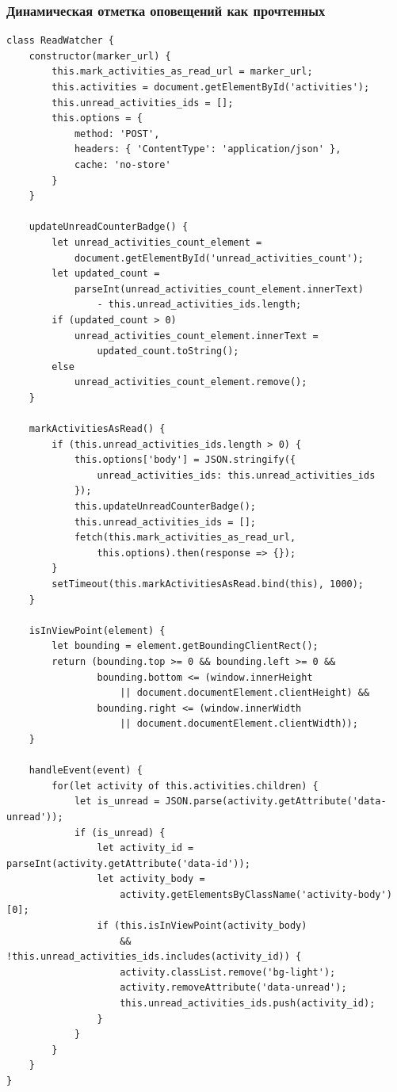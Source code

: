 \documentclass[12pt, a4paper, oneside]{article}
\begin{document}
\subsubsection{Динамическая отметка оповещений как прочтенных}
\begin{verbatim}
class ReadWatcher {
    constructor(marker_url) {
        this.mark_activities_as_read_url = marker_url;
        this.activities = document.getElementById('activities');
        this.unread_activities_ids = [];
        this.options = { 
            method: 'POST',
            headers: { 'ContentType': 'application/json' },
            cache: 'no-store' 
        }
    }

    updateUnreadCounterBadge() {
        let unread_activities_count_element = 
            document.getElementById('unread_activities_count');
        let updated_count = 
            parseInt(unread_activities_count_element.innerText) 
                - this.unread_activities_ids.length;
        if (updated_count > 0)
            unread_activities_count_element.innerText = 
                updated_count.toString();
        else
            unread_activities_count_element.remove();
    }

    markActivitiesAsRead() {
        if (this.unread_activities_ids.length > 0) {
            this.options['body'] = JSON.stringify({
                unread_activities_ids: this.unread_activities_ids 
            });
            this.updateUnreadCounterBadge();
            this.unread_activities_ids = [];
            fetch(this.mark_activities_as_read_url, 
                this.options).then(response => {});
        }
        setTimeout(this.markActivitiesAsRead.bind(this), 1000);
    }

    isInViewPoint(element) {
        let bounding = element.getBoundingClientRect();
        return (bounding.top >= 0 && bounding.left >= 0 &&
                bounding.bottom <= (window.innerHeight 
                    || document.documentElement.clientHeight) &&
                bounding.right <= (window.innerWidth 
                    || document.documentElement.clientWidth));
    }

    handleEvent(event) {
        for(let activity of this.activities.children) {
            let is_unread = JSON.parse(activity.getAttribute('data-unread'));
            if (is_unread) {
                let activity_id = parseInt(activity.getAttribute('data-id'));
                let activity_body = 
                    activity.getElementsByClassName('activity-body')[0];
                if (this.isInViewPoint(activity_body) 
                    && !this.unread_activities_ids.includes(activity_id)) {
                    activity.classList.remove('bg-light');
                    activity.removeAttribute('data-unread');
                    this.unread_activities_ids.push(activity_id);
                }
            }
        }
    }
}    
\end{verbatim}
\end{document}
